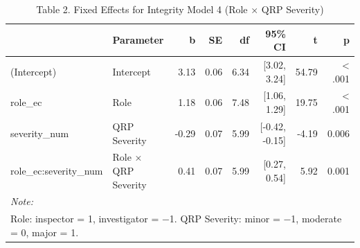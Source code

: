 \documentclass[
]{article}
\begin{document}
\begin{longtable}[t]{llrrrrrr}
\caption{\label{tab:unnamed-chunk-19}Table 2. Fixed Effects for Integrity Model 4 (Role × QRP Severity)}\\
\toprule
 & Parameter & b & SE & df & 95\% CI & t & p\\
\midrule
(Intercept) & Intercept & 3.13 & 0.06 & 6.34 & {}[3.02, 3.24] & 54.79 & < .001\\
role\_ec & Role & 1.18 & 0.06 & 7.48 & {}[1.06, 1.29] & 19.75 & < .001\\
severity\_num & QRP Severity & -0.29 & 0.07 & 5.99 & {}[-0.42, -0.15] & -4.19 & 0.006\\
role\_ec:severity\_num & Role × QRP Severity & 0.41 & 0.07 & 5.99 & {}[0.27, 0.54] & 5.92 & 0.001\\
\bottomrule
\multicolumn{8}{l}{\rule{0pt}{1em}\textit{Note: }}\\
\multicolumn{8}{l}{\rule{0pt}{1em}Role: inspector = 1, investigator = −1. QRP Severity: minor = −1, moderate = 0, major = 1.}\\
\end{longtable}
\end{document}
